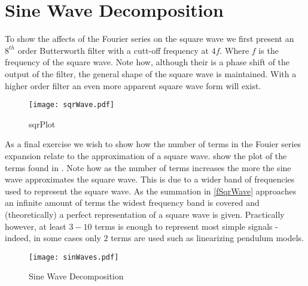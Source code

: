 \documentclass[main.tex]{subfile}
\begin{document}
\section{Sine Wave Decomposition} 
\label{sec:sections}

To show the affects of the Fourier series on the square wave we first present an
$8^{th}$ order Butterworth filter with a cutt-off frequency at $4f$. Where $f$
is the frequency of the square wave. Note how, although their is a phase shift
of the output of the filter, the general shape of the square wave is maintained.
With a higher order filter an even more apparent square wave form will exist.

\begin{figure}[H]
    \begin{center}
      \texttt{[image: sqrWave.pdf]}
    \end{center}
    \caption{sqrPlot}
    \label{fig:sqrPlot}
  \end{figure}

As a final exercise we wish to show how the number of terms in the Fouier series
expansion relate to the approximation of a square wave.  show
the plot of the terms found in . Note how as the number of
terms increases the more the sine wave approximates the square wave. This is due
to a wider band of frequencies used to represent the square wave. As the
summation in \eqref{fSqrWave} approaches an infinite amount of terms the widest
frequency band is covered and (theoretically) a perfect representation of a
square wave is given. Practically however, at least $3 - 10$ terms is enough to
represent most simple signals - indeed, in some cases only $2$ terms are used
such as linearizing pendulum models.
 
\begin{figure}[H]
	\begin{center}
		\texttt{[image: sinWaves.pdf]}
	\end{center}
	\caption{Sine Wave Decomposition}
	\label{fig:sinPlot}
\end{figure}

\end{document}
